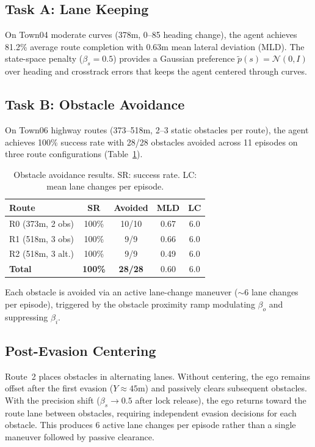 \documentclass{article}
\begin{document}
\subsection{Task A: Lane Keeping}

On Town04 moderate curves (378m, 0\degree--85\degree{} heading
change), the agent achieves 81.2\% average route completion with
0.63m mean lateral deviation (MLD). The state-space penalty
($\beta_s{=}0.5$) provides a Gaussian preference
$\tilde{p}(s) = \mathcal{N}(0, I)$ over heading and crosstrack
errors that keeps the agent centered through curves.

\subsection{Task B: Obstacle Avoidance}

On Town06 highway routes (373--518m, 2--3 static obstacles per
route), the agent achieves 100\% success rate with 28/28 obstacles
avoided across 11 episodes on three route configurations
(Table~\ref{tab:results}).

\begin{table}[t]
\centering
\caption{Obstacle avoidance results. SR: success rate. LC: mean
lane changes per episode.}
\label{tab:results}
\begin{tabular}{lcccc}
\toprule
\textbf{Route} & \textbf{SR} & \textbf{Avoided} & \textbf{MLD} & \textbf{LC} \\
\midrule
R0 (373m, 2 obs) & 100\% & 10/10 & 0.67 & 6.0 \\
R1 (518m, 3 obs) & 100\% & 9/9 & 0.66 & 6.0 \\
R2 (518m, 3 alt.) & 100\% & 9/9 & 0.49 & 6.0 \\
\midrule
\textbf{Total} & \textbf{100\%} & \textbf{28/28} & 0.60 & 6.0 \\
\bottomrule
\end{tabular}
\end{table}

Each obstacle is avoided via an active lane-change maneuver
($\sim$6 lane changes per episode), triggered by the obstacle
proximity ramp modulating $\beta_o$ and suppressing $\beta_i$.

\subsection{Post-Evasion Centering}

Route~2 places obstacles in alternating lanes. Without centering,
the ego remains offset after the first evasion ($Y \approx 45$m)
and passively clears subsequent obstacles. With the precision
shift ($\beta_s \rightarrow 0.5$ after lock release), the ego
returns toward the route lane between obstacles, requiring
independent evasion decisions for each obstacle. This produces 6
active lane changes per episode rather than a single maneuver
followed by passive clearance.
\end{document}

